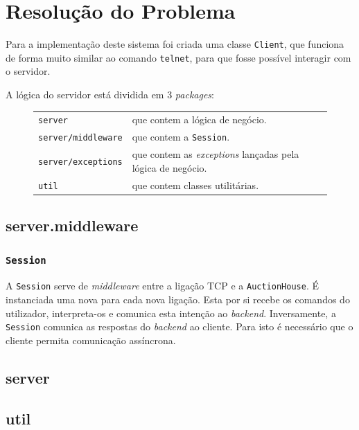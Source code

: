 \documentclass[a4paper]{article}
\begin{document}
\pagebreak
\section{Resolução do Problema}

Para a implementação deste sistema foi criada uma classe \texttt{Client}, que funciona de forma muito similar ao comando \texttt{telnet}, para que fosse possível interagir com o servidor.

A lógica do servidor está dividida em 3 \textit{packages}:

\begin{figure}[H]
    \begin{tabular}{ll}
        \texttt{server}            & que contem a lógica de negócio.\\
        \texttt{server/middleware} & que contem a \texttt{Session}.\\
        \texttt{server/exceptions} & que contem as \textit{exceptions} lançadas pela lógica de negócio.\\
        \texttt{util}              & que contem classes utilitárias.
    \end{tabular}
\end{figure}

\subsection{server.middleware}
\subsubsection{\texttt{Session}}

A \texttt{Session} serve de \textit{middleware} entre a ligação TCP e a \texttt{AuctionHouse}. É instanciada uma nova para cada nova ligação. Esta por si recebe os comandos do utilizador, interpreta-os e comunica esta intenção ao \textit{backend}. Inversamente, a \texttt{Session} comunica as respostas do \textit{backend} ao cliente. Para isto é necessário que o cliente permita comunicação assíncrona.


\subsection{server}


\subsection{util}
\end{document}
